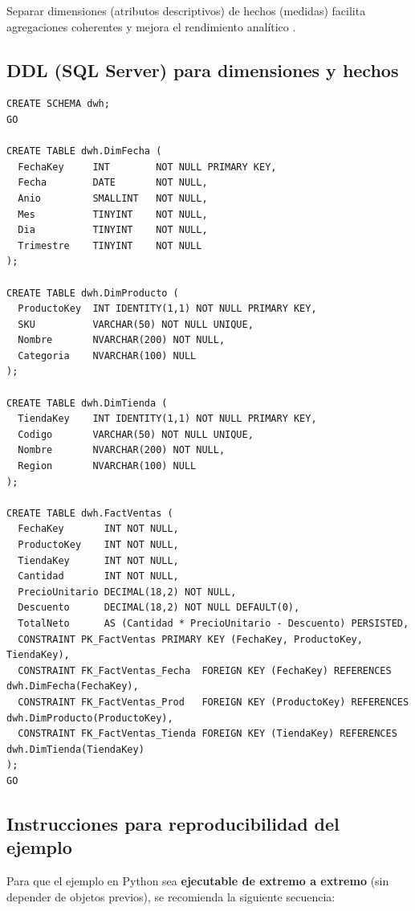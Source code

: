 \documentclass[12pt]{article}
\begin{document}
Separar dimensiones (atributos descriptivos) de hechos (medidas) facilita agregaciones coherentes y mejora el rendimiento analítico \cite{kimball_etl_toolkit}.

\subsection{DDL (SQL Server) para dimensiones y hechos}
\begin{lstlisting}[style=sql, caption={DDL simplificado para un esquema estrella}]
CREATE SCHEMA dwh;
GO

CREATE TABLE dwh.DimFecha (
  FechaKey     INT        NOT NULL PRIMARY KEY,
  Fecha        DATE       NOT NULL,
  Anio         SMALLINT   NOT NULL,
  Mes          TINYINT    NOT NULL,
  Dia          TINYINT    NOT NULL,
  Trimestre    TINYINT    NOT NULL
);

CREATE TABLE dwh.DimProducto (
  ProductoKey  INT IDENTITY(1,1) NOT NULL PRIMARY KEY,
  SKU          VARCHAR(50) NOT NULL UNIQUE,
  Nombre       NVARCHAR(200) NOT NULL,
  Categoria    NVARCHAR(100) NULL
);

CREATE TABLE dwh.DimTienda (
  TiendaKey    INT IDENTITY(1,1) NOT NULL PRIMARY KEY,
  Codigo       VARCHAR(50) NOT NULL UNIQUE,
  Nombre       NVARCHAR(200) NOT NULL,
  Region       NVARCHAR(100) NULL
);

CREATE TABLE dwh.FactVentas (
  FechaKey       INT NOT NULL,
  ProductoKey    INT NOT NULL,
  TiendaKey      INT NOT NULL,
  Cantidad       INT NOT NULL,
  PrecioUnitario DECIMAL(18,2) NOT NULL,
  Descuento      DECIMAL(18,2) NOT NULL DEFAULT(0),
  TotalNeto      AS (Cantidad * PrecioUnitario - Descuento) PERSISTED,
  CONSTRAINT PK_FactVentas PRIMARY KEY (FechaKey, ProductoKey, TiendaKey),
  CONSTRAINT FK_FactVentas_Fecha  FOREIGN KEY (FechaKey) REFERENCES dwh.DimFecha(FechaKey),
  CONSTRAINT FK_FactVentas_Prod   FOREIGN KEY (ProductoKey) REFERENCES dwh.DimProducto(ProductoKey),
  CONSTRAINT FK_FactVentas_Tienda FOREIGN KEY (TiendaKey) REFERENCES dwh.DimTienda(TiendaKey)
);
GO
\end{lstlisting}



\subsection{Instrucciones para reproducibilidad del ejemplo}
Para que el ejemplo en Python sea \textbf{ejecutable de extremo a extremo} (sin depender de objetos previos), se recomienda la siguiente secuencia:
\end{document}
